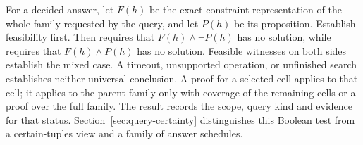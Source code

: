 For a decided answer, let $F(h)$ be the exact constraint representation of the
whole family requested by the query, and let $P(h)$ be its proposition.
Establish feasibility first. Then  requires that
$F(h)\land\neg P(h)$ has no solution, while  requires that
$F(h)\land P(h)$ has no solution. Feasible witnesses on both sides establish
the mixed case. A timeout, unsupported operation, or unfinished search
establishes neither universal conclusion. A proof for a selected cell applies
to that cell; it applies to the parent family only with coverage of the
remaining cells or a proof over the full family. The result records the
scope, query kind and evidence for that status.
Section~\ref{sec:query-certainty} distinguishes this Boolean test from a
certain-tuples view and a family of answer schedules.

